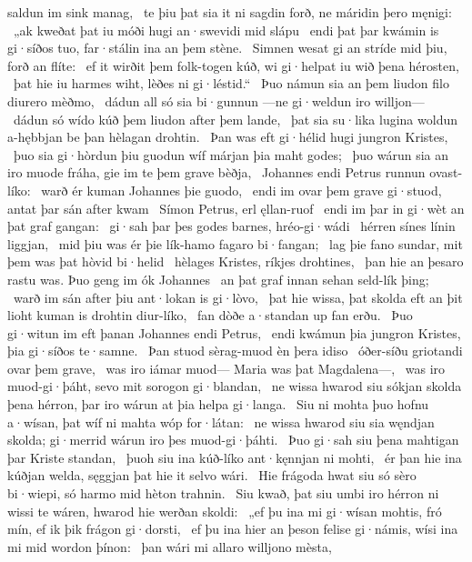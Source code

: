 saldun im sink manag, \hld\ te þiu þat sia it ni sagdin forð,
ne máridin þero męnigi: \hld\ „ak kweðat þat iu móði hugi
an·swevidi mid slápu \hld\ endi þat þar kwámin is gi·síðos tuo,
far·stálin ina an þem stène. \hld\ Simnen wesat gi an stríde mid þiu,
forð an flíte: \hld\ ef it wirðit þem folk-togen kúð,
wi gi·helpat iu wið þena hérosten, \hld\ þat hie iu harmes wiht,
lèðes ni gi·léstid.“ \hld\ Þuo námun sia an þem liudon filo
diurero mèðmo, \hld\ dádun all só sia bi·gunnun
—ne gi·weldun iro willjon— \hld\ dádun só wído kúð
þem liudon after þem lande, \hld\ þat sia su·lika lugina woldun
a-hębbjan be þan hèlagan drohtin. \hld\ Þan was eft gi·hélid hugi
jungron Kristes, \hld\ þuo sia gi·hòrdun þiu guodun wíf
márjan þia maht godes; \hld\ þuo wárun sia an iro muode fráha,
gie im te þem grave bèðja, \hld\ Johannes endi Petrus
runnun ovast-líko: \hld\ warð ér kuman
Johannes þie guodo, \hld\ endi im ovar þem grave gi·stuod,
antat þar sán after kwam \hld\ Símon Petrus,
erl ęllan-ruof \hld\ endi im þar in gi·wèt
an þat graf gangan: \hld\ gi·sah þar þes godes barnes,
hréo-gi·wádi \hld\ hérren sínes
línin liggjan, \hld\ mid þiu was ér þie lík-hamo
fagaro bi·fangan; \hld\ lag þie fano sundar,
mit þem was þat hòvid bi·helid \hld\ hèlages Kristes,
ríkjes drohtines, \hld\ þan hie an þesaro rastu was.
Þuo geng im ók Johannes \hld\ an þat graf innan
sehan seld-lík þing; \hld\ warð im sán after þiu
ant·lokan is gi·lòvo, \hld\ þat hie wissa, þat skolda eft an þit lioht kuman
is drohtin diur-líko, \hld\ fan dòðe a·standan
up fan erðu. \hld\ Þuo gi·witun im eft þanan
Johannes endi Petrus, \hld\ endi kwámun þia jungron Kristes,
þia gi·síðos te·samne. \hld\ Þan stuod sèrag-muod
èn þera idiso \hld\ óðer-síðu
griotandi ovar þem grave, \hld\ was iro iámar muod—
Maria was þat Magdalena—, \hld\ was iro muod-gi·þáht,
sevo mit sorogon gi·blandan, \hld\ ne wissa hwarod siu sókjan skolda
þena hérron, þar iro wárun at þia helpa gi·langa. \hld\ Siu ni mohta þuo hofnu a·wísan,
þat wíf ni mahta wóp for·látan: \hld\ ne wissa hwarod siu sia węndjan skolda;
gi·merrid wárun iro þes muod-gi·þáhti. \hld\ Þuo gi·sah siu þena mahtigan þar
Kriste standan, \hld\ þuoh siu ina kúð-líko
ant·kęnnjan ni mohti, \hld\ ér þan hie ina kúðjan welda,
sęggjan þat hie it selvo wári. \hld\ Hie frágoda hwat siu só sèro bi·wiepi,
só harmo mid hèton trahnin. \hld\ Siu kwað, þat siu umbi iro hérron ni wissi
te wáren, hwarod hie werðan skoldi: \hld\ „ef þu ina mi gi·wísan mohtis,
fró mín, ef ik þik frágon gi·dorsti, \hld\ ef þu ina hier an þeson felise gi·námis,
wísi ina mi mid wordon þínon: \hld\ þan wári mi allaro willjono mèsta,
